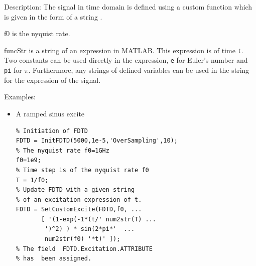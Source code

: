 \begin{FontDescr}{Description:}
       The signal in time domain is defined using a  custom function which is given in the form of a string .
    \begin{FontPara}{f0}  \label{para:customf0}
     is the nyquist rate.
    \end{FontPara}
    \begin{FontPara}{funcStr}  \label{para:funcStr}
         is a string of an expression in MATLAB. This expression is of time \texttt{t}.  Two constants can be used directly in the expression, \texttt{e} for Euler's number and \texttt{pi} for $\pi$. Furthermore, any strings of defined variables can be used in the  string  for the expression of the signal.
    \end{FontPara}
\end{FontDescr}

\begin{FontDescr}{Examples:}
    \begin{itemize}
	\item A ramped sinus excite
	\begin{lstlisting}
% Initiation of FDTD
FDTD = InitFDTD(5000,1e-5,'OverSampling',10);
% The nyquist rate f0=1GHz
f0=1e9;
% Time step is of the nyquist rate f0
T = 1/f0;
% Update FDTD with a given string
% of an excitation expression of t.
FDTD = SetCustomExcite(FDTD,f0, ...
       [ '(1-exp(-1*(t/' num2str(T) ...
        ')^2) ) * sin(2*pi*'  ...
        num2str(f0) '*t)' ]);
% The field  FDTD.Excitation.ATTRIBUTE
% has  been assigned.
	\end{lstlisting}
\end{itemize}
\end{FontDescr}
